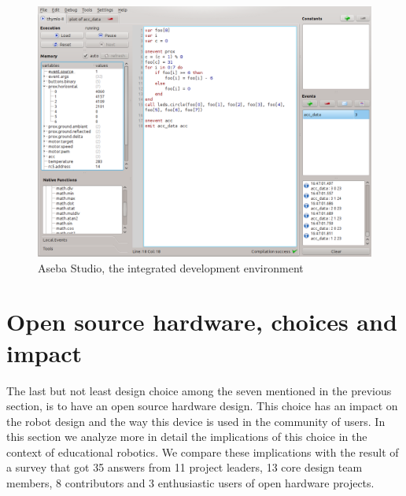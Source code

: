 \documentclass[letterpaper, 10 pt, conference]{ieeeconf}  %
\begin{document}
\begin{figure}
\centering
\includegraphics[width=\columnwidth]{figures/aseba-studio}
\caption{Aseba Studio, the integrated development environment}
\label{fig:aseba-studio}
\end{figure}

\section{Open source hardware, choices and impact}

The last but not least design choice among the seven mentioned in the previous section, is to have an open source hardware design.
This choice has an impact on the robot design and the way this device is used in the community of users. 
In this section we analyze more in detail the implications of this choice in the context of educational robotics.
We compare these implications with the result of a survey that got 35 answers from 11 project leaders, 13 core design team members, 8 contributors and 3 enthusiastic users of open hardware projects.
\end{document}
